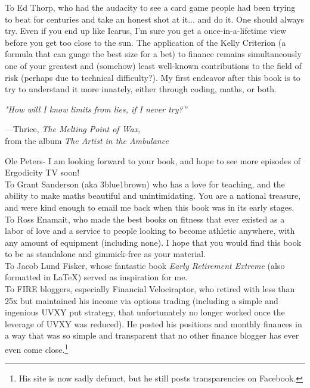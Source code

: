 To Ed Thorp, who had the audacity to see a card game people had been trying to beat for centuries and take an honest shot at it... and do it. One should always try. Even if you end up like Icarus, I'm sure you get a once-in-a-lifetime view before you get too close to the sun. The application of the Kelly Criterion (a formula that can guage the best size for a bet) to finance remains simultaneously one of your greatest and (somehow) least well-known contributions to the field of risk (perhaps due to technical difficulty?). My first endeavor after this book is to try to understand it more innately, either through coding, maths, or both.\\

\epigraph{\emph{"How will I know limits from lies, if I never try?”}}{---Thrice, \emph{The Melting Point of Wax},\\ from the album \emph{The Artist in the Ambulance}}

Ole Peters- I am looking forward to your book, and hope to see more episodes of Ergodicity TV soon!\\

To Grant Sanderson (aka 3blue1brown) who has a love for teaching, and the ability to make maths beautiful and unintimidating. You are a national treasure, and were kind enough to email me back when this book was in its early stages.\\

To Ross Enamait, who made the best books on fitness that ever existed as a labor of love and a service to people looking to become athletic anywhere, with any amount of equipment (including none). I hope that you would find this book to be as standalone and gimmick-free as your material.\\

To Jacob Lund Fisker, whose fantastic book \emph{Early Retirement Extreme} (also formatted in \LaTeX) served as inspiration for me.\\

To FIRE bloggers, especially Financial Velociraptor, who retired with less than 25x but maintained his income via options trading (including a simple and ingenious UVXY put strategy, that unfortunately no longer worked once the leverage of UVXY was reduced). He posted his positions and monthly finances in a way that was so simple and transparent that no other finance blogger has ever even come close.\footnote{His site is now sadly defunct, but he still posts transparencies on Facebook.}\\

